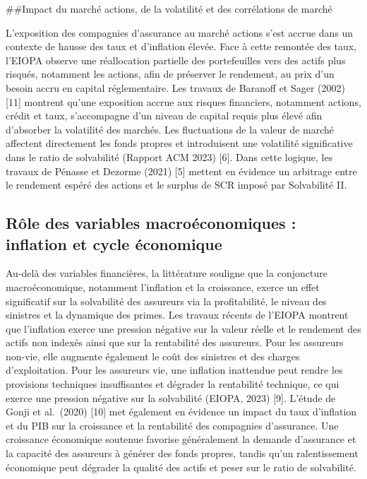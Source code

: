 \documentclass[
]{article}
\begin{document}
\#\#Impact du marché actions, de la volatilité et des corrélations de
marché

L'exposition des compagnies d'assurance au marché actions s'est accrue
dans un contexte de hausse des taux et d'inflation élevée. Face à cette
remontée des taux, l'EIOPA observe une réallocation partielle des
portefeuilles vers des actifs plus risqués, notamment les actions, afin
de préserver le rendement, au prix d'un besoin accru en capital
réglementaire. Les travaux de Baranoff et Sager (2002) {[}11{]} montrent
qu'une exposition accrue aux risques financiers, notamment actions,
crédit et taux, s'accompagne d'un niveau de capital requis plus élevé
afin d'absorber la volatilité des marchés. Les fluctuations de la valeur
de marché affectent directement les fonds propres et introduisent une
volatilité significative dans le ratio de solvabilité (Rapport ACM 2023)
{[}6{]}. Dans cette logique, les travaux de Pénasse et Dezorme (2021)
{[}5{]} mettent en évidence un arbitrage entre le rendement espéré des
actions et le surplus de SCR imposé par Solvabilité II.

\subsection{Rôle des variables macroéconomiques : inflation et cycle
économique}\label{ruxf4le-des-variables-macrouxe9conomiques-inflation-et-cycle-uxe9conomique}

Au-delà des variables financières, la littérature souligne que la
conjoncture macroéconomique, notamment l'inflation et la croissance,
exerce un effet significatif sur la solvabilité des assureurs via la
profitabilité, le niveau des sinistres et la dynamique des primes. Les
travaux récents de l'EIOPA montrent que l'inflation exerce une pression
négative sur la valeur réelle et le rendement des actifs non indexés
ainsi que sur la rentabilité des assureurs. Pour les assureurs non-vie,
elle augmente également le coût des sinistres et des charges
d'exploitation. Pour les assureurs vie, une inflation inattendue peut
rendre les provisions techniques insuffisantes et dégrader la
rentabilité technique, ce qui exerce une pression négative sur la
solvabilité (EIOPA, 2023) {[}9{]}. L'étude de Gonji et al.~(2020)
{[}10{]} met également en évidence un impact du taux d'inflation et du
PIB sur la croissance et la rentabilité des compagnies d'assurance. Une
croissance économique soutenue favorise généralement la demande
d'assurance et la capacité des assureurs à générer des fonds propres,
tandis qu'un ralentissement économique peut dégrader la qualité des
actifs et peser sur le ratio de solvabilité.
\end{document}
